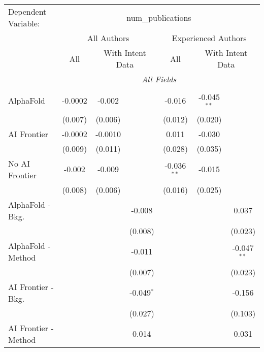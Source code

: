 \begingroup
\centering
\begin{tabular}{lcccccc}
   \tabularnewline \midrule \midrule
   Dependent Variable: & \multicolumn{6}{c}{num\_publications}\\
 & \multicolumn{3}{c}{All Authors} & \multicolumn{3}{c}{Experienced Authors} \\
\cmidrule(lr){2-4} \cmidrule(lr){5-7}
 & \multicolumn{1}{c}{All} & \multicolumn{2}{c}{With Intent Data} & \multicolumn{1}{c}{All} & \multicolumn{2}{c}{With Intent Data} \\
\cmidrule(lr){2-2} \cmidrule(lr){3-4} \cmidrule(lr){5-5} \cmidrule(lr){6-7}
 & \multicolumn{6}{c}{\textit{All Fields}} \\ \\
   AlphaFold               & -0.0002   & -0.002  &               & -0.016        & -0.045$^{**}$ &   \\   
                           & (0.007)   & (0.006) &               & (0.012)       & (0.020)       &   \\   
   AI Frontier             & -0.0002   & -0.0010 &               & 0.011         & -0.030        &   \\   
                           & (0.009)   & (0.011) &               & (0.028)       & (0.035)       &   \\   
   No AI Frontier          & -0.002    & -0.009  &               & -0.036$^{**}$ & -0.015        &   \\   
                           & (0.008)   & (0.006) &               & (0.016)       & (0.025)       &   \\   
   AlphaFold - Bkg.        &           &         & -0.008        &               &               & 0.037\\   
                           &           &         & (0.008)       &               &               & (0.023)\\   
   AlphaFold - Method      &           &         & -0.011        &               &               & -0.047$^{**}$\\   
                           &           &         & (0.007)       &               &               & (0.023)\\   
   AI Frontier - Bkg.      &           &         & -0.049$^{*}$  &               &               & -0.156\\   
                           &           &         & (0.027)       &               &               & (0.103)\\   
   AI Frontier - Method    &           &         & 0.014         &               &               & 0.031\\   

\end{tabular}

